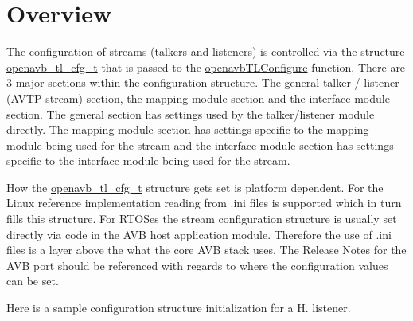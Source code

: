 \hypertarget{sdk_avtp_stream_cfg_sdk_avtp_stream_cfg_overview}{}\section{Overview }\label{sdk_avtp_stream_cfg_sdk_avtp_stream_cfg_overview}
The configuration of streams (talkers and listeners) is controlled via the structure \hyperlink{structopenavb__tl__cfg__t}{openavb\+\_\+tl\+\_\+cfg\+\_\+t} that is passed to the \hyperlink{tl_2openavb__tl__pub_8h_af3f5f9270f359618de3497ab9a469b83}{openavb\+T\+L\+Configure} function. There are 3 major sections within the configuration structure. The general talker / listener (A\+V\+TP stream) section, the mapping module section and the interface module section. The general section has settings used by the talker/listener module directly. The mapping module section has settings specific to the mapping module being used for the stream and the interface module section has settings specific to the interface module being used for the stream.

How the \hyperlink{structopenavb__tl__cfg__t}{openavb\+\_\+tl\+\_\+cfg\+\_\+t} structure gets set is platform dependent. For the Linux reference implementation reading from .ini files is supported which in turn fills this structure. For R\+T\+O\+Ses the stream configuration structure is usually set directly via code in the A\+VB host application module. Therefore the use of .ini files is a layer above the what the core A\+VB stack uses. The Release Notes for the A\+VB port should be referenced with regards to where the configuration values can be set.

Here is a sample configuration structure initialization for a H. listener.


